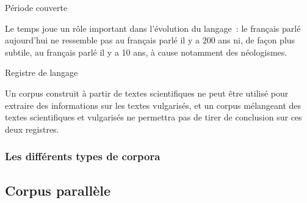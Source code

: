 \begin{frame}[allowframebreaks]
\framebreak

\begin{block}{Période couverte}

Le temps joue un rôle important dans l'évolution du langage~: le français parlé 
aujourd'hui ne ressemble pas au français parlé il y a 200 ans ni, de façon plus 
subtile, au français parlé il y a 10 ans, à cause notamment des néologismes.

\end{block}


\begin{block}{Registre de langage}

Un corpus construit à partir de textes scientifiques ne peut être utilisé pour 
extraire des informations sur les textes vulgarisés, et un corpus mélangeant des
textes scientifiques et vulgarisés ne permettra pas de tirer de conclusion sur 
ces deux registres.

\end{block}

\end{frame}

\begin{frame}
\frametitle{Les différents types de corpora}
\tableofcontents[sectionstyle=show/hide,subsectionstyle=show]
\end{frame}


\subsection{Corpus parallèle}


